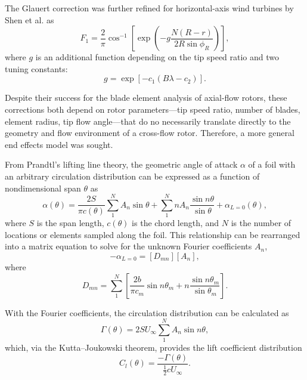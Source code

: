 \documentclass[times]{weauth}
\begin{document}
The Glauert correction was further refined for horizontal-axis wind turbines by
Shen et al. \cite{Shen2005a} as
\begin{equation}
    F_1 = \frac{2}{\pi} \cos^{-1} \left[ \exp \left( -g \frac{N (R-r)}{2R \sin
    \phi_R} \right) \right],
\end{equation}
where $g$ is an additional function depending on the tip speed ratio and two
tuning constants:
\begin{equation}
    g = \exp [ -c_1 (B \lambda - c_2) ].
\end{equation}

Despite their success for the blade element analysis of axial-flow rotors, these
corrections both depend on rotor parameters---tip speed ratio, number of blades,
element radius, tip flow angle---that do no necessarily translate directly to
the geometry and flow environment of a cross-flow rotor. Therefore, a more
general end effects model was sought.

From Prandtl's lifting line theory, the geometric angle of attack $\alpha$ of a
foil with an arbitrary circulation distribution can be expressed as a function
of nondimensional span $\theta$ as \cite{Anderson2001}
\begin{equation}
    \alpha (\theta) = \frac{2S}{\pi c (\theta)}
    \sum_1^N A_n \sin \theta
    + \sum_1^N n A_n \frac{\sin n \theta}{\sin \theta}
    + \alpha_{L = 0}(\theta),
    \label{eq:lifting-line}
\end{equation}
where $S$ is the span length, $c(\theta)$ is the chord length, and $N$ is the
number of locations or elements sampled along the foil. This relationship can be
rearranged into a matrix equation to solve for the unknown Fourier coefficients
$A_n$,
\begin{equation}
    [\alpha_m ] - \alpha_{L=0} = [D_{mn}][A_n],
\end{equation}
where
\begin{equation}
    D_{mn} = \sum_1^N \left[ \frac{2b}{\pi c_m} \sin n \theta_m + n \frac{\sin n
        \theta_m}{\sin \theta_m} \right].
\end{equation}

With the Fourier coefficients, the circulation distribution can be calculated as
\begin{equation}
    \Gamma (\theta) = 2SU_\infty \sum_1^N A_n \sin n \theta,
\end{equation}
which, via the Kutta--Joukowski theorem, provides the lift coefficient
distribution
\begin{equation}
    C_l(\theta) = \frac{-\Gamma (\theta)}{\frac{1}{2} c U_\infty}.
\end{equation}
\end{document}
